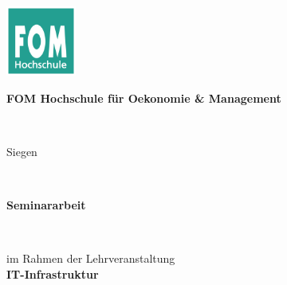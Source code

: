 \documentclass[12pt,oneside,titlepage,listof=totoc,bibliography=totoc]{scrartcl}
\newif\ifde
\newif\ifen
\newcommand{\myLehrveranstaltung}{IT-Infrastruktur}
\newcommand{\mySemesterZahl}{7}
\newcommand{\myHochschulName}{FOM Hochschule für Oekonomie \& Management}
\newcommand{\myHochschulStandort}{Siegen}
\newcommand{\myStudiengang}{Wirtschaftsinformatik}
\newcommand{\myThesisArt}{Seminararbeit}
\newcommand{\myAkademischerGrad}{Bachelor of Science (B.Sc.)}
\newcommand{\langde}[1]{%
   \ifde\selectlanguage{ngerman}#1\fi}
\newcommand{\langen}[1]{%
   \ifen\selectlanguage{english}#1\fi}
\begin{document}
% 
\begin{titlepage}
	\begin{center}
    \includegraphics[width=2.3cm]{media/fomLogo} \\
    \vspace{.5cm}
		\begin{Large}\textbf{\myHochschulName}\end{Large}\\
    \vspace{.5cm}
		\begin{Large}\langde{Hochschulzentrum} \myHochschulStandort\end{Large}\\
		\vspace{2cm}
    \begin{Large}\textbf{\myThesisArt}\end{Large}\\
    \vspace{1.8cm}
    
		im Rahmen der Lehrveranstaltung\\
		\textbf{\myLehrveranstaltung}\\
		\vspace{1.8cm}


		\langde{über das Thema}
		\langen{on the subject}\\


\end{center}
\end{titlepage}
\end{document}
